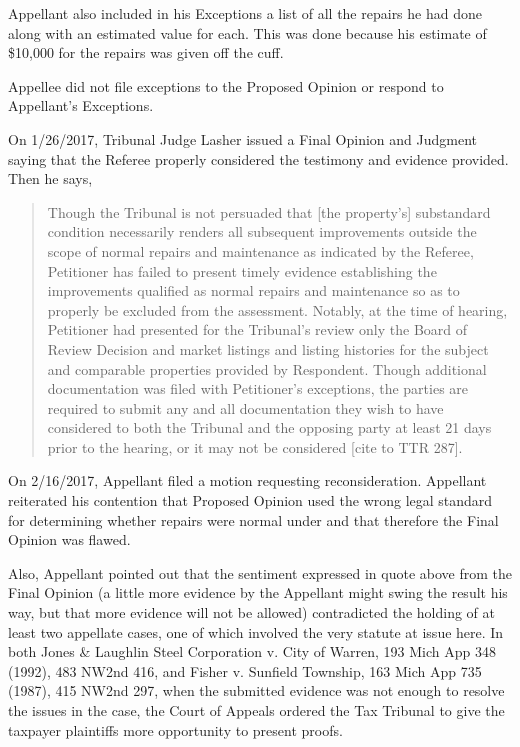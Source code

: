 Appellant also included in his Exceptions a list of all the repairs he had done along with an estimated value for each. This was done because his estimate of \$10,000 for the repairs was given off the cuff.

Appellee did not file exceptions to the Proposed Opinion or respond to Appellant's Exceptions.

On 1/26/2017, Tribunal Judge Lasher issued a Final Opinion and Judgment saying that the Referee properly considered the testimony and evidence provided. Then he says,

\begin{quote}%
Though the Tribunal is not persuaded that [the property's] substandard condition necessarily renders all subsequent improvements outside the scope of normal repairs and maintenance as indicated by the Referee, Petitioner has failed to present timely evidence establishing the improvements qualified as normal repairs and maintenance so as to properly be excluded from the assessment. Notably, at the time of hearing, Petitioner had presented for the Tribunal's review only the Board of Review Decision and market listings and listing histories for the subject and comparable properties provided by Respondent. Though additional documentation was filed with Petitioner's exceptions, the parties are required to submit any and all documentation they wish to have considered to both the Tribunal and the opposing party at least 21 days prior to the hearing, or it may not be considered [cite to TTR 287].
\end{quote}

On 2/16/2017, Appellant filed a motion requesting reconsideration. Appellant reiterated his contention that Proposed Opinion used the wrong legal standard for determining whether repairs were normal under  and that therefore the Final Opinion was flawed. 

Also, Appellant pointed out that the sentiment expressed in quote above from the Final Opinion (a little more evidence by the Appellant might swing the result his way, but that more evidence will not be allowed) contradicted the holding of at least two appellate cases, one of which involved the very statute at issue here. In both Jones \& Laughlin Steel Corporation v. City of Warren, 193 Mich App 348 (1992), 483 NW2nd 416, and Fisher v. Sunfield Township, 163 Mich App 735 (1987), 415 NW2nd 297, when the submitted evidence was not enough to resolve the issues in the case, the Court of Appeals ordered the Tax Tribunal to give the taxpayer plaintiffs more opportunity to present proofs. 

